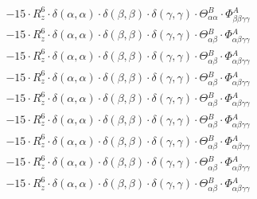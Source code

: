 \documentclass{article}
\begin{document}
\begin{subequations}
\begin{gather}
\begin{array}{c}
 \\[0.2em] 		 - 15 \cdot R_{z}^{6} \cdot \delta{}\left(\alpha{}, \alpha{}\right) \cdot \delta{}\left(\beta{}, \beta{}\right) \cdot \delta{}\left(\gamma{}, \gamma{}\right) \cdot \Theta{}^{B}_{\alpha{}\alpha{}} \cdot \Phi{}^{A}_{\beta{}\beta{}\gamma{}\gamma{}} 
 \\[0.2em] 		 - 15 \cdot R_{z}^{6} \cdot \delta{}\left(\alpha{}, \alpha{}\right) \cdot \delta{}\left(\beta{}, \beta{}\right) \cdot \delta{}\left(\gamma{}, \gamma{}\right) \cdot \Theta{}^{B}_{\alpha{}\beta{}} \cdot \Phi{}^{A}_{\alpha{}\beta{}\gamma{}\gamma{}} 
 \\[0.2em] 		 - 15 \cdot R_{z}^{6} \cdot \delta{}\left(\alpha{}, \alpha{}\right) \cdot \delta{}\left(\beta{}, \beta{}\right) \cdot \delta{}\left(\gamma{}, \gamma{}\right) \cdot \Theta{}^{B}_{\alpha{}\beta{}} \cdot \Phi{}^{A}_{\alpha{}\beta{}\gamma{}\gamma{}} 
 \\[0.2em] 		 - 15 \cdot R_{z}^{6} \cdot \delta{}\left(\alpha{}, \alpha{}\right) \cdot \delta{}\left(\beta{}, \beta{}\right) \cdot \delta{}\left(\gamma{}, \gamma{}\right) \cdot \Theta{}^{B}_{\alpha{}\beta{}} \cdot \Phi{}^{A}_{\alpha{}\beta{}\gamma{}\gamma{}} 
 \\[0.2em] 		 - 15 \cdot R_{z}^{6} \cdot \delta{}\left(\alpha{}, \alpha{}\right) \cdot \delta{}\left(\beta{}, \beta{}\right) \cdot \delta{}\left(\gamma{}, \gamma{}\right) \cdot \Theta{}^{B}_{\alpha{}\beta{}} \cdot \Phi{}^{A}_{\alpha{}\beta{}\gamma{}\gamma{}} 
 \\[0.2em] 		 - 15 \cdot R_{z}^{6} \cdot \delta{}\left(\alpha{}, \alpha{}\right) \cdot \delta{}\left(\beta{}, \beta{}\right) \cdot \delta{}\left(\gamma{}, \gamma{}\right) \cdot \Theta{}^{B}_{\alpha{}\beta{}} \cdot \Phi{}^{A}_{\alpha{}\beta{}\gamma{}\gamma{}} 
 \\[0.2em] 		 - 15 \cdot R_{z}^{6} \cdot \delta{}\left(\alpha{}, \alpha{}\right) \cdot \delta{}\left(\beta{}, \beta{}\right) \cdot \delta{}\left(\gamma{}, \gamma{}\right) \cdot \Theta{}^{B}_{\alpha{}\beta{}} \cdot \Phi{}^{A}_{\alpha{}\beta{}\gamma{}\gamma{}} 
 \\[0.2em] 		 - 15 \cdot R_{z}^{6} \cdot \delta{}\left(\alpha{}, \alpha{}\right) \cdot \delta{}\left(\beta{}, \beta{}\right) \cdot \delta{}\left(\gamma{}, \gamma{}\right) \cdot \Theta{}^{B}_{\alpha{}\beta{}} \cdot \Phi{}^{A}_{\alpha{}\beta{}\gamma{}\gamma{}} 
 \\[0.2em] 		 - 15 \cdot R_{z}^{6} \cdot \delta{}\left(\alpha{}, \alpha{}\right) \cdot \delta{}\left(\beta{}, \beta{}\right) \cdot \delta{}\left(\gamma{}, \gamma{}\right) \cdot \Theta{}^{B}_{\alpha{}\beta{}} \cdot \Phi{}^{A}_{\alpha{}\beta{}\gamma{}\gamma{}} 

\end{array}
\end{gather}
\end{subequations}
\end{document}
